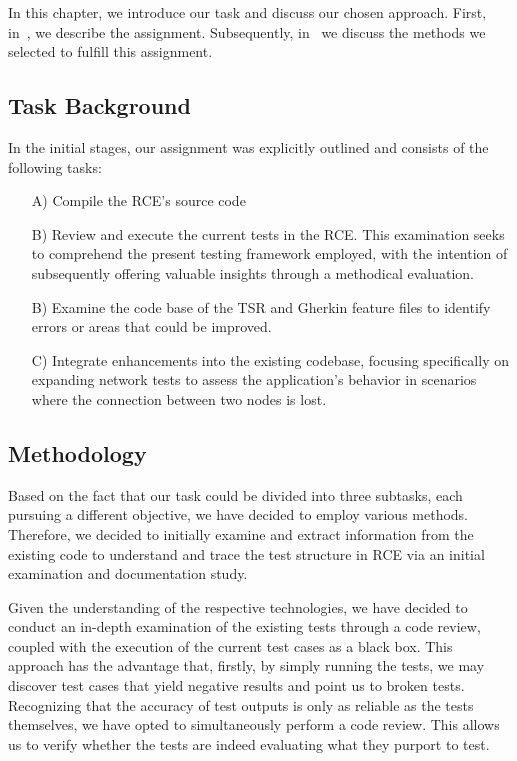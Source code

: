 \label{sec:method}
In this chapter, we introduce our task and discuss our chosen approach. First, in~, we describe the assignment. Subsequently, in~ we discuss the methods we selected to fulfill this assignment.

\subsection{Task Background}
\label{subsec:Task}
In the initial stages, our assignment was explicitly outlined and consists of the following tasks: 
\begin{enumerate}
    \item[A)] Compile the \ac{RCE}'s source code
    \item[B)] Review and execute the current tests in the \ac{RCE}. This examination seeks to comprehend the present testing framework employed, with the intention of subsequently offering valuable insights through a methodical evaluation.
    \item[B)] Examine the code base of the \acl{TSR} and Gherkin feature files to identify errors or areas that could be improved.
    \item[C)] Integrate enhancements into the existing codebase, focusing specifically on expanding network tests to assess the application's behavior in scenarios where the connection between two nodes is lost.
\end{enumerate}

\subsection{Methodology}
\label{subsec:Methodologies}
Based on the fact that our task could be divided into three subtasks, each pursuing a different objective, we have decided to employ various methods. Therefore, we decided to initially examine and extract information from the existing code to understand and trace the test structure in \ac{RCE} via an initial examination and documentation study.

Given the understanding of the respective technologies, we have decided to conduct an in-depth examination of the existing tests through a code review, coupled with the execution of the current test cases as a black box. This approach has the advantage that, firstly, by simply running the tests, we may discover test cases that yield negative results and point us to broken tests. Recognizing that the accuracy of test outputs is only as reliable as the tests themselves, we have opted to simultaneously perform a code review. This allows us to verify whether the tests are indeed evaluating what they purport to test. 


